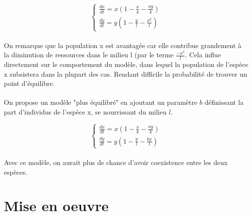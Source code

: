 \documentclass{article}
\begin{document}
\begin{equation*}
\left\{
\begin{array}{ll}
    \frac{dx}{dt} =  x(1 - \frac{x}{k} - \frac{a y}{k}) \\
    \frac{dy}{dt} = y(1- \frac{y}{l} - \frac{x^{2}}{l})
\end{array}
\right.
\end{equation*}\\

On remarque que la population x est avantagée car elle contribue grandement à la diminution de ressources dans le milieu l (par le terme $\frac{-x^2}{l}$. Cela influe directement sur le comportement du modèle, dans lequel la population de l'espèce x subsistera dans la plupart des cas. Rendant difficile la probabilité de trouver un point d'équilibre. \\ \\
On propose un modèle "plus équilibré" en ajoutant un paramètre $b$ définissant la part d'individus de l'espèce x, se nourrissant du milieu $l$.

\begin{equation*}
\left\{
\begin{array}{ll}
    \frac{dx}{dt} =  x(1 - \frac{x}{k} - \frac{a y}{k}) \\
    \frac{dy}{dt} = y(1- \frac{y}{l} - \frac{b x}{l})
\end{array}
\right.
\end{equation*}\\
\noindent
Avec ce modèle, on aurait plus de chance d'avoir coexistence entre les deux espèces.
\newpage
\section{Mise en oeuvre}
\end{document}

